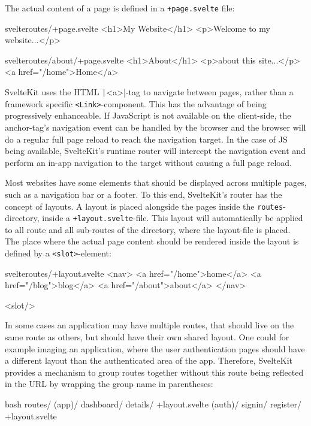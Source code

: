 The actual content of a page is defined in a \texttt{+page.svelte} file:
\begin{myminted}{svelte}{routes/+page.svelte}
<h1>My Website</h1>
<p>Welcome to my website...</p>
\end{myminted}
\begin{myminted}{svelte}{routes/about/+page.svelte}
<h1>About</h1>
<p>about this site...</p>
<a href="/home">Home</a>
\end{myminted}

SvelteKit uses the HTML \texttt|<a>|-tag to navigate between pages, rather than a framework specific \texttt{<Link>}-component. This has the advantage of being progressively enhanceable. If JavaScript is not available on the client-side, the anchor-tag's navigation event can be handled by the browser and the browser will do a regular full page reload to reach the navigation target. In the case of JS being available, SvelteKit's runtime router will intercept the navigation event and perform an in-app navigation to the target without causing a full page reload.

Most websites have some elements that should be displayed across multiple pages, such as a navigation bar or a footer. To this end, SvelteKit's router has the concept of layouts. A layout is placed alongside the pages inside the \texttt{routes}-directory, inside a \texttt{+layout.svelte}-file. This layout will automatically be applied to all route and all sub-routes of the directory, where the layout-file is placed. The place where the actual page content should be rendered inside the layout is defined by a \texttt{<slot>}-element:

\begin{myminted}{svelte}{routes/+layout.svelte}
<nav>
  <a href="/home">home</a>
  <a href="/blog">blog</a>
  <a href="/about">about</a>
</nav>

<slot/>
\end{myminted}

In some cases an application may have multiple routes, that should live on the same route as others, but should have their own shared layout. One could for example imaging an application, where the user authentication pages should have a different layout than the authenticated area of the app. Therefore, SvelteKit provides a mechanism to group routes together without this route being reflected in the URL by wrapping the group name in parentheses:

\begin{myminted}[highlightlines={2,6}]{bash}{}
routes/
  (app)/
    dashboard/
    details/
    +layout.svelte
  (auth)/
    signin/
    register/
    +layout.svelte
\end{myminted}

